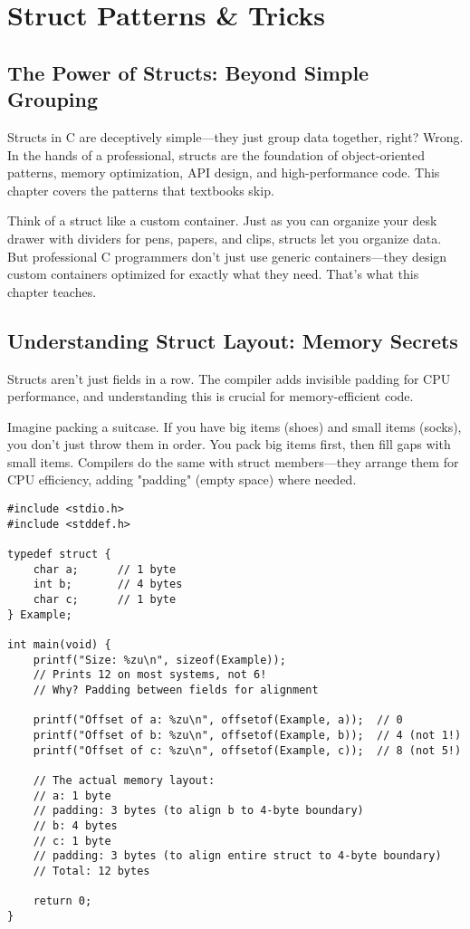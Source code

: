 \chapter{Struct Patterns \& Tricks}

\section{The Power of Structs: Beyond Simple Grouping}

Structs in C are deceptively simple---they just group data together, right? Wrong. In the hands of a professional, structs are the foundation of object-oriented patterns, memory optimization, API design, and high-performance code. This chapter covers the patterns that textbooks skip.

Think of a struct like a custom container. Just as you can organize your desk drawer with dividers for pens, papers, and clips, structs let you organize data. But professional C programmers don't just use generic containers---they design custom containers optimized for exactly what they need. That's what this chapter teaches.

\section{Understanding Struct Layout: Memory Secrets}

Structs aren't just fields in a row. The compiler adds invisible padding for CPU performance, and understanding this is crucial for memory-efficient code.

Imagine packing a suitcase. If you have big items (shoes) and small items (socks), you don't just throw them in order. You pack big items first, then fill gaps with small items. Compilers do the same with struct members---they arrange them for CPU efficiency, adding "padding" (empty space) where needed.

\begin{lstlisting}
#include <stdio.h>
#include <stddef.h>

typedef struct {
    char a;      // 1 byte
    int b;       // 4 bytes
    char c;      // 1 byte
} Example;

int main(void) {
    printf("Size: %zu\n", sizeof(Example));
    // Prints 12 on most systems, not 6!
    // Why? Padding between fields for alignment

    printf("Offset of a: %zu\n", offsetof(Example, a));  // 0
    printf("Offset of b: %zu\n", offsetof(Example, b));  // 4 (not 1!)
    printf("Offset of c: %zu\n", offsetof(Example, c));  // 8 (not 5!)

    // The actual memory layout:
    // a: 1 byte
    // padding: 3 bytes (to align b to 4-byte boundary)
    // b: 4 bytes
    // c: 1 byte
    // padding: 3 bytes (to align entire struct to 4-byte boundary)
    // Total: 12 bytes

    return 0;
}
\end{lstlisting}

